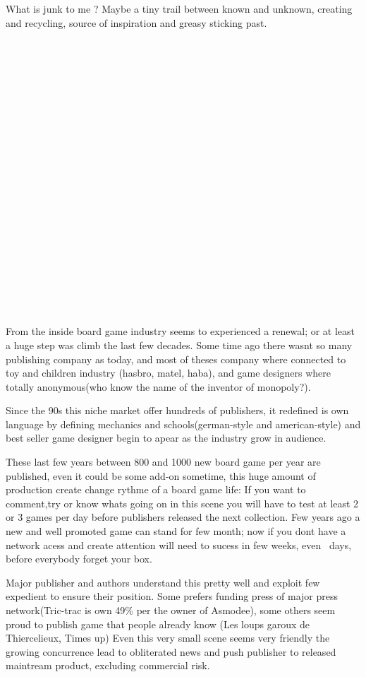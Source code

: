 What is junk to me ? Maybe a tiny trail between known and unknown,
creating and recycling, source of inspiration and greasy sticking past.

~

~

~

~

~

~

~

~

~

~

~

~


From the inside board game industry seems to experienced a renewal; or
at least a huge step was climb the last few decades. Some time ago
there was{\textquotesingle}nt so many publishing company as today, and
most of theses company where connected to toy and children industry
(hasbro, matel, haba), and game designers where totally anonymous(who
know the name of the inventor of monopoly?). ~

Since the 90{\textquotesingle}s this niche market offer hundreds of
publishers, it redefined is own language by defining mechanics and
{\textquotedbl}schools{\textquotedbl}(german-style and american-style)
and best seller game designer begin to apear as the industry grow in
audience.~

These last few years between 800 and 1000 new board game per year are
published, even it could be some add-on sometime, this huge amount of
production create change rythme of a board game life: If you want to
comment,try or know what{\textquotesingle}s going on in this scene you
will have to test at least 2 or 3 games per day before publishers
released the next collection. Few years ago a new and well promoted
game can stand for few month; now if you don{\textquotesingle}t have a
network acess and create attention will need to sucess in few weeks,
even ~days, before everybody forget your box.

Major publisher and authors understand this pretty well and exploit few
expedient to ensure their position. Some prefers funding press of major
press network(Tric-trac is own 49\% per the owner of Asmodee), some
others seem proud to publish game that people already know (Les loups
garoux de Thiercelieux, Time{\textquotesingle}s up) Even this very
small scene seems very friendly the growing concurrence lead to
obliterated news and push publisher to released maintream product,
excluding commercial risk.

